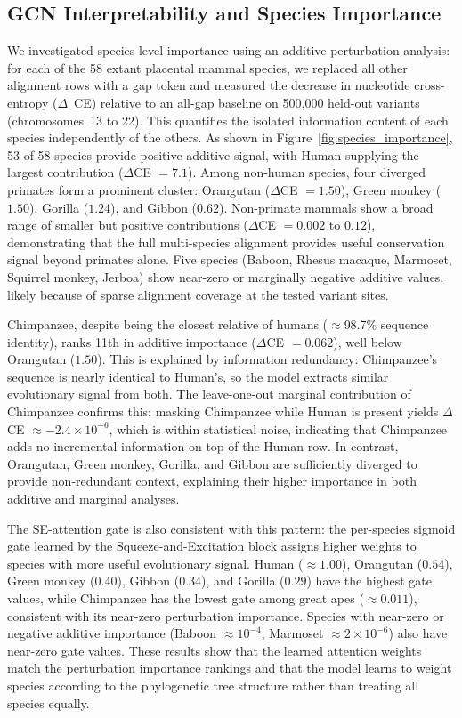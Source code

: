 \documentclass[unnumsec,webpdf,contemporary,large]{oup-authoring-template}%
\newcommand{\rev}[1]{{\color{red}#1}}
\theoremstyle{thmstyleone}%
\theoremstyle{thmstyletwo}%
\theoremstyle{thmstylethree}%
\begin{document}
\subsection{\rev{GCN Interpretability and Species Importance}}



\rev{We investigated species-level importance using an additive perturbation analysis: for each of the 58 extant placental mammal species, we replaced all other alignment rows with a gap token and measured the decrease in nucleotide cross-entropy ($\Delta$~CE) relative to an all-gap baseline on 500,000 held-out variants (chromosomes~13 to 22). This quantifies the isolated information content of each species independently of the others. As shown in Figure~\ref{fig:species_importance}, 53 of 58 species provide positive additive signal, with Human supplying the largest contribution ($\Delta$CE $= 7.1$). Among non-human species, four diverged primates form a prominent cluster: Orangutan ($\Delta$CE $= 1.50$), Green monkey ($1.50$), Gorilla ($1.24$), and Gibbon ($0.62$). Non-primate mammals show a broad range of smaller but positive contributions ($\Delta$CE $= 0.002$ to $0.12$), demonstrating that the full multi-species alignment provides useful conservation signal beyond primates alone. Five species (Baboon, Rhesus macaque, Marmoset, Squirrel monkey, Jerboa) show near-zero or marginally negative additive values, likely because of sparse alignment coverage at the tested variant sites.}

\rev{Chimpanzee, despite being the closest relative of humans ($\approx$98.7\% sequence identity), ranks 11th in additive importance ($\Delta$CE $= 0.062$), well below Orangutan ($1.50$). This is explained by information redundancy: Chimpanzee's sequence is nearly identical to Human's, so the model extracts similar evolutionary signal from both. The leave-one-out marginal contribution of Chimpanzee confirms this: masking Chimpanzee while Human is present yields $\Delta$CE $\approx -2.4 \times 10^{-6}$, which is within statistical noise, indicating that Chimpanzee adds no incremental information on top of the Human row. In contrast, Orangutan, Green monkey, Gorilla, and Gibbon are sufficiently diverged to provide non-redundant context, explaining their higher importance in both additive and marginal analyses.}

\rev{The SE-attention gate is also consistent with this pattern: the per-species sigmoid gate learned by the Squeeze-and-Excitation block assigns higher weights to species with more useful evolutionary signal. Human ($\approx 1.00$), Orangutan ($0.54$), Green monkey ($0.40$), Gibbon ($0.34$), and Gorilla ($0.29$) have the highest gate values, while Chimpanzee has the lowest gate among great apes ($\approx 0.011$), consistent with its near-zero perturbation importance. Species with near-zero or negative additive importance (Baboon $\approx 10^{-4}$, Marmoset $\approx 2\times10^{-6}$) also have near-zero gate values. These results show that the learned attention weights match the perturbation importance rankings and that the model learns to weight species according to the phylogenetic tree structure rather than treating all species equally.}
\end{document}

